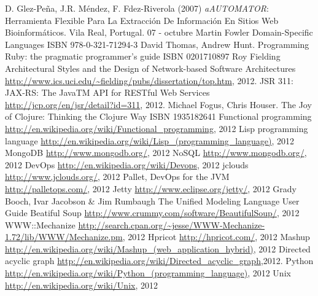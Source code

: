 \documentclass[a4paper,12pt,twoside]{report}
\begin{document}
\begin{thebibliography}{1}

  D. Glez-Peña, J.R. Méndez, F. Fdez-Riverola (2007)
  \newblock \emph{aAUTOMATOR}: Herramienta Flexible Para La
  Extracción De Información En Sitios Web Bioinformáticos. Vila Real,
  Portugal. 07 - octubre
  Martin Fowler
  \newblock Domain-Specific Languages
  \newblock ISBN 978-0-321-71294-3
  David Thomas, Andrew Hunt.
  \newblock Programming Ruby: the pragmatic programmer's guide
  \newblock ISBN 0201710897
  Roy Fielding
  \newblock Architectural Styles and
  the Design of Network-based Software Architectures
  \newblock
  \url{http://www.ics.uci.edu/~fielding/pubs/dissertation/top.htm},
  2012.
  \newblock JSR 311: JAX-RS: The JavaTM API for RESTful Web Services
  \newblock \url{http://jcp.org/en/jsr/detail?id=311}, 2012.
  Michael Fogus, Chris Houser.
  \newblock The Joy of Clojure: Thinking the Clojure Way
  \newblock ISBN 1935182641
  \newblock Functional programming
  \newblock \url{http://en.wikipedia.org/wiki/Functional_programming}, 2012
  \newblock Lisp programming language
  \newblock \url{http://en.wikipedia.org/wiki/Lisp_(programming_language)}, 2012
  \newblock MongoDB
  \newblock \url{http://www.mongodb.org/}, 2012
  \newblock NoSQL
  \newblock \url{http://www.mongodb.org/}, 2012
  \newblock DevOps
  \url{http://en.wikipedia.org/wiki/Devops}, 2012
  \newblock jclouds
  \newblock \url{http://www.jclouds.org/}, 2012
  \newblock Pallet, DevOps for the JVM
  \newblock \url{http://palletops.com/}, 2012
  \newblock Jetty
  \newblock \url{http://www.eclipse.org/jetty/}, 2012
  Grady Booch, Ivar Jacobson \& Jim Rumbaugh
  \newblock The Unified Modeling Language User Guide
  \newblock Beatiful Soup
  \newblock \url{http://www.crummy.com/software/BeautifulSoup/}, 2012
  \newblock WWW::Mechanize
  \newblock
  \url{http://search.cpan.org/~jesse/WWW-Mechanize-1.72/lib/WWW/Mechanize.pm},
  2012
  \newblock Hpricot
  \newblock \url{http://hpricot.com/}, 2012
  \newblock Mashup
  \newblock \url{http://en.wikipedia.org/wiki/Mashup_(web_application_hybrid)}, 2012
\newblock Directed acyclic graph
\newblock \url{http://en.wikipedia.org/wiki/Directed_acyclic_graph},2012.
\newblock Python
\newblock
\url{http://en.wikipedia.org/wiki/Python_(programming_language)}, 2012
\newblock Unix
\newblock \url{http://en.wikipedia.org/wiki/Unix}, 2012


\end{thebibliography}
\end{document}
